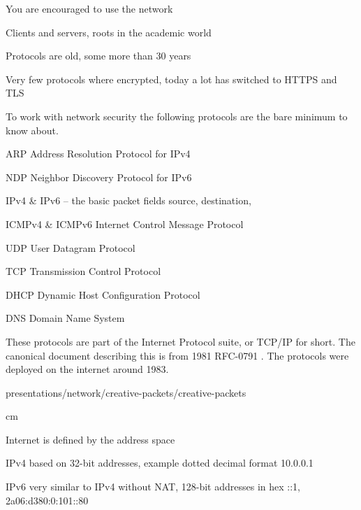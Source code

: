 \documentclass[Screen16to9,17pt]{foils}
\begin{document}
\vspace{10mm}
\centerline{\Large You are encouraged to use the network}





\begin{list1}
\item Clients and servers, roots in the academic world
\item Protocols are old, some more than 30 years
\item Very few protocols where encrypted, today a lot has switched to HTTPS and TLS
\end{list1}



To work with network security the following protocols are the bare minimum to know about.

\begin{list2}
\item ARP Address Resolution Protocol for IPv4
\item NDP Neighbor Discovery Protocol for IPv6
\item IPv4 \& IPv6 -- the basic packet fields source, destination,
\item ICMPv4 \& ICMPv6 Internet Control Message Protocol
\item UDP User Datagram Protocol
\item TCP Transmission Control Protocol
\item DHCP Dynamic Host Configuration Protocol
\item DNS Domain Name System
\end{list2}

These protocols are part of the Internet Protocol suite, or TCP/IP for short. The canonical document describing this is from 1981 RFC-0791 . The protocols were deployed on the internet around 1983.


presentations/network/creative-packets/creative-packets

 cm

\begin{list2}
\item Internet is defined by the address space
\item IPv4 based on 32-bit addresses, example dotted decimal format 10.0.0.1
\item IPv6 very similar to IPv4 without NAT, 128-bit addresses in hex ::1, 2a06:d380:0:101::80
\end{list2}
\end{document}
